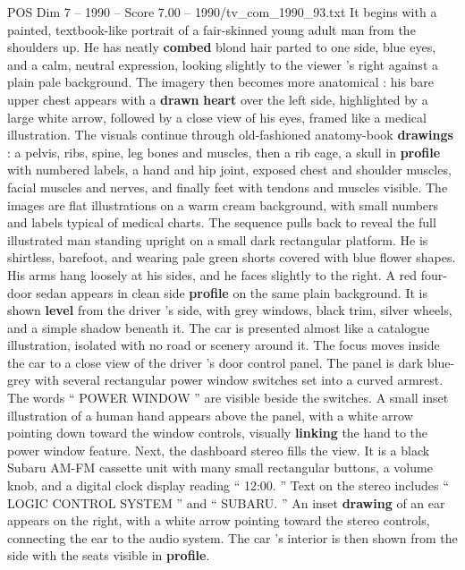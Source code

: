 \begin{textsample}{POS Dim 7 – 1990 – Score 7.00 – 1990/tv\_com\_1990\_93.txt}  \label{ex:f7_pos_065}
It begins with a painted, textbook-like portrait of a fair-skinned young adult man from the shoulders up.
He has neatly \textbf{combed} blond hair parted to one side, blue eyes, and a calm, neutral expression, looking slightly to the viewer ’s right against a plain pale background.
The imagery then becomes more anatomical : his bare upper chest appears with a \textbf{drawn} \textbf{heart} over the left side, highlighted by a large white arrow, followed by a close view of his eyes, framed like a medical illustration.
The visuals continue through old-fashioned anatomy-book \textbf{drawings} : a pelvis, ribs, spine, leg bones and muscles, then a rib cage, a skull in \textbf{profile} with numbered labels, a hand and hip joint, exposed chest and shoulder muscles, facial muscles and nerves, and finally feet with tendons and muscles visible.
The images are flat illustrations on a warm cream background, with small numbers and labels typical of medical charts.
The sequence pulls back to reveal the full illustrated man standing upright on a small dark rectangular platform.
He is shirtless, barefoot, and wearing pale green shorts covered with blue flower shapes.
His arms hang loosely at his sides, and he faces slightly to the right.
A red four-door sedan appears in clean side \textbf{profile} on the same plain background.
It is shown \textbf{level} from the driver ’s side, with grey windows, black trim, silver wheels, and a simple shadow beneath it.
The car is presented almost like a catalogue illustration, isolated with no road or scenery around it.
The focus moves inside the car to a close view of the driver ’s door control panel.
The panel is dark blue-grey with several rectangular power window switches set into a curved armrest.
The words “ POWER WINDOW ” are visible beside the switches.
A small inset illustration of a human hand appears above the panel, with a white arrow pointing down toward the window controls, visually \textbf{linking} the hand to the power window feature.
Next, the dashboard stereo fills the view.
It is a black Subaru AM-FM cassette unit with many small rectangular buttons, a volume knob, and a digital clock display reading “ 12:00. ” Text on the stereo includes “ LOGIC CONTROL SYSTEM ” and “ SUBARU. ” An inset \textbf{drawing} of an ear appears on the right, with a white arrow pointing toward the stereo controls, connecting the ear to the audio system.
The car ’s interior is then shown from the side with the seats visible in \textbf{profile}.

\end{textsample}

